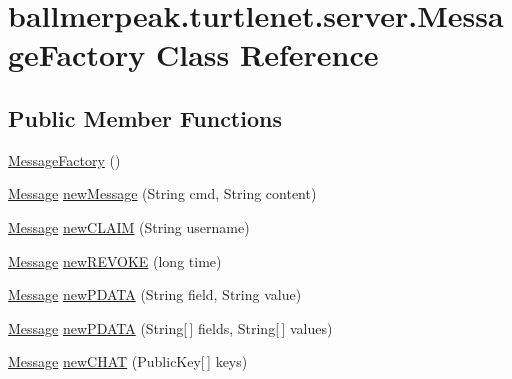 \hypertarget{classballmerpeak_1_1turtlenet_1_1server_1_1MessageFactory}{\section{ballmerpeak.\-turtlenet.\-server.\-Message\-Factory Class Reference}
\label{classballmerpeak_1_1turtlenet_1_1server_1_1MessageFactory}
}
\subsection*{Public Member Functions}
\begin{DoxyCompactItemize}
\item 
\hyperlink{classballmerpeak_1_1turtlenet_1_1server_1_1MessageFactory_af1d89c1c60b23a27b395ced57813edf1}{Message\-Factory} ()
\item 
\hyperlink{classballmerpeak_1_1turtlenet_1_1shared_1_1Message}{Message} \hyperlink{classballmerpeak_1_1turtlenet_1_1server_1_1MessageFactory_a7002eaa445dc787d9f48c522e3c4d38f}{new\-Message} (String cmd, String content)
\item 
\hyperlink{classballmerpeak_1_1turtlenet_1_1shared_1_1Message}{Message} \hyperlink{classballmerpeak_1_1turtlenet_1_1server_1_1MessageFactory_a96cb2d8fa129ec51603a53f0bffd821d}{new\-C\-L\-A\-I\-M} (String username)
\item 
\hyperlink{classballmerpeak_1_1turtlenet_1_1shared_1_1Message}{Message} \hyperlink{classballmerpeak_1_1turtlenet_1_1server_1_1MessageFactory_aef6d14c4ca6c13776d25fa525c1f39fc}{new\-R\-E\-V\-O\-K\-E} (long time)
\item 
\hyperlink{classballmerpeak_1_1turtlenet_1_1shared_1_1Message}{Message} \hyperlink{classballmerpeak_1_1turtlenet_1_1server_1_1MessageFactory_a46db634da1ffe850a4066cae406db0cd}{new\-P\-D\-A\-T\-A} (String field, String value)
\item 
\hyperlink{classballmerpeak_1_1turtlenet_1_1shared_1_1Message}{Message} \hyperlink{classballmerpeak_1_1turtlenet_1_1server_1_1MessageFactory_a1a8e1c48e4a813a743ddc65fc73616bb}{new\-P\-D\-A\-T\-A} (String\mbox{[}$\,$\mbox{]} fields, String\mbox{[}$\,$\mbox{]} values)
\item 
\hyperlink{classballmerpeak_1_1turtlenet_1_1shared_1_1Message}{Message} \hyperlink{classballmerpeak_1_1turtlenet_1_1server_1_1MessageFactory_abe8168e826ccb131414c28811af014ec}{new\-C\-H\-A\-T} (Public\-Key\mbox{[}$\,$\mbox{]} keys)
\item 

\end{DoxyCompactItemize}
